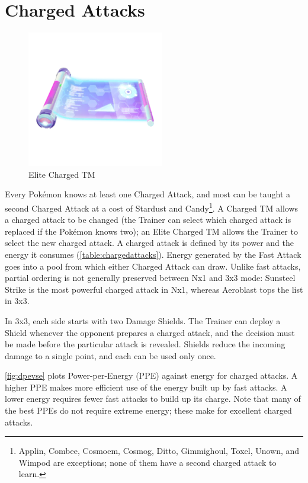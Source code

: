 \section{Charged Attacks}
\label{sec:charged}
\begin{figure}
  \centering
  \vspace{-\intextsep}
  \includegraphics[width=.25\textwidth]{images/elitechargedtm.png}
  \caption*{Elite Charged TM}
\end{figure}
Every Pokémon knows at least one Charged Attack, and most can be taught a second
  Charged Attack at a cost of Stardust and Candy\footnote{Applin, Combee,
  Cosmoem, Cosmog, Ditto, Gimmighoul, Toxel, Unown, and Wimpod are exceptions;
  none of them have a second charged attack to learn.}.
A Charged TM allows a charged attack to be changed (the Trainer can select
  which charged attack is replaced if the Pokémon knows two);
  an Elite Charged TM allows the Trainer to select the new charged attack.
A charged attack is defined by its power and the energy it consumes (\autoref{table:chargedattacks}).
Energy generated by the Fast Attack goes into a pool from which either Charged Attack can draw.
Unlike fast attacks, partial ordering is not generally preserved between Nx1 and 3x3 mode:
  Sunsteel Strike is the most powerful charged attack in Nx1, whereas Aeroblast tops
  the list in 3x3.


In 3x3, each side starts with two Damage Shields.
The Trainer can deploy a Shield whenever the opponent prepares a charged attack,
   and the decision must be made before the particular attack is revealed.
Shields reduce the incoming damage to a single point, and each can be used only once.

\autoref{fig:dpevse} plots Power-per-Energy (PPE) against energy for charged attacks.
A higher PPE makes more efficient use of the energy built up by fast attacks.
A lower energy requires fewer fast attacks to build up its charge.
Note that many of the best PPEs do not require extreme energy; these make
 for excellent charged attacks.

